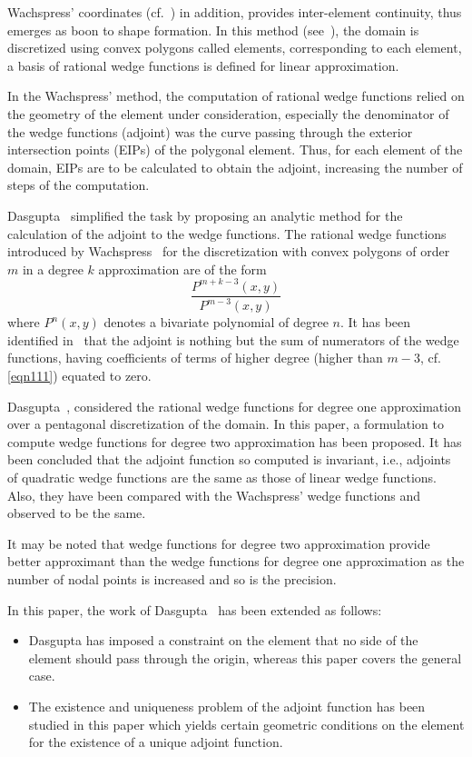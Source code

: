 \documentclass[automatic-bibliography, defaultmaths=false]{univsciauth}
\begin{document}
Wachspress' coordinates (cf.~\cite{wach}) in addition, provides inter-element
continuity, thus emerges as boon to shape formation. In this method
(see~\cite{wachs}), the domain is discretized using convex polygons called
elements, corresponding to each element, a basis of rational wedge functions is
defined for linear approximation.

In the Wachspress\rq{} method, the computation of rational wedge functions
relied on the geometry of the element under consideration, especially the
denominator of the wedge functions (adjoint) was the curve passing through the
exterior intersection points (EIPs) of the polygonal element. Thus, for each
element of the domain, EIPs are to be calculated to obtain the adjoint,
increasing the number of steps of the computation.

Dasgupta~\cite{das} simplified the task by proposing an analytic method for the
calculation of the adjoint to the wedge functions. The rational wedge functions
introduced by Wachspress~\cite{wachs} for the discretization with convex
polygons of order $m$ in a degree $k$ approximation are of the form
\begin{equation}
  \frac{P^{m+k-3}(x,y)}{P^{m-3}(x,y)} \label{eqn111}
\end{equation}
where $P^n(x,y)$ denotes a bivariate polynomial of degree  $n$. It has been
identified in~\cite{das} that the adjoint is nothing but the sum of numerators
of the wedge functions, having coefficients of terms of higher degree (higher
than $m-3$, cf. \autoref{eqn111}) equated to zero.

Dasgupta~\cite{das}, considered the rational wedge functions for degree one
approximation over a pentagonal discretization of the domain. In this paper, a
formulation to compute wedge functions for degree two approximation has been
proposed. It has been concluded that the adjoint function so computed is
invariant, i.e., adjoints of quadratic wedge functions are the same as those of
linear wedge functions. Also, they have been compared with the Wachspress\rq{}
wedge functions and observed to be the same.

It may be noted that wedge functions for degree two approximation provide better
approximant than the wedge functions for degree one approximation as the number
of nodal points is increased and so is the precision.

In this paper, the work of Dasgupta~\cite{das} has been extended as follows:
\begin{itemize}
  \item Dasgupta has imposed a constraint on the element that no side of
        the element should pass through the origin, whereas this paper covers the
        general case.
  \item The existence and uniqueness problem of the adjoint function has
        been studied in this paper which yields certain geometric conditions on the
        element for the existence of a unique adjoint function.
\end{itemize}
\end{document}
